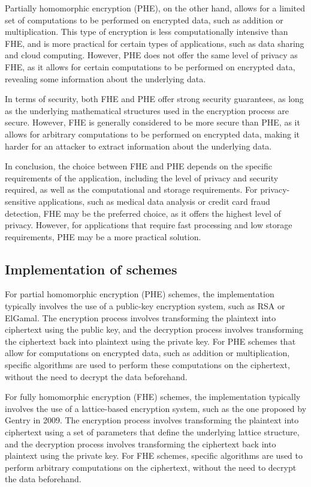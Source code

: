\documentclass[conference]{IEEEtran}
\begin{document}
Partially homomorphic encryption (PHE), on the other hand, allows for a limited set of computations to be performed on encrypted data, such as addition or multiplication. This type of encryption is less computationally intensive than FHE, and is more practical for certain types of applications, such as data sharing and cloud computing. However, PHE does not offer the same level of privacy as FHE, as it allows for certain computations to be performed on encrypted data, revealing some information about the underlying data.

In terms of security, both FHE and PHE offer strong security guarantees, as long as the underlying mathematical structures used in the encryption process are secure. However, FHE is generally considered to be more secure than PHE, as it allows for arbitrary computations to be performed on encrypted data, making it harder for an attacker to extract information about the underlying data.

In conclusion, the choice between FHE and PHE depends on the specific requirements of the application, including the level of privacy and security required, as well as the computational and storage requirements. For privacy-sensitive applications, such as medical data analysis or credit card fraud detection, FHE may be the preferred choice, as it offers the highest level of privacy. However, for applications that require fast processing and low storage requirements, PHE may be a more practical solution.
\subsection{Implementation of schemes}
For partial homomorphic encryption (PHE) schemes, the implementation typically involves the use of a public-key encryption system, such as RSA or ElGamal. The encryption process involves transforming the plaintext into ciphertext using the public key, and the decryption process involves transforming the ciphertext back into plaintext using the private key. For PHE schemes that allow for computations on encrypted data, such as addition or multiplication, specific algorithms are used to perform these computations on the ciphertext, without the need to decrypt the data beforehand.

For fully homomorphic encryption (FHE) schemes, the implementation typically involves the use of a lattice-based encryption system, such as the one proposed by Gentry in 2009. The encryption process involves transforming the plaintext into ciphertext using a set of parameters that define the underlying lattice structure, and the decryption process involves transforming the ciphertext back into plaintext using the private key. For FHE schemes, specific algorithms are used to perform arbitrary computations on the ciphertext, without the need to decrypt the data beforehand.
\end{document}
